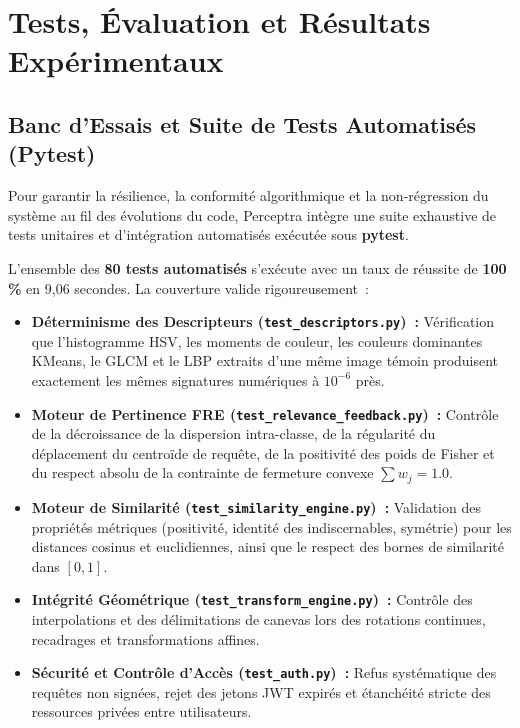 \chapter{Tests, Évaluation et Résultats Expérimentaux}
\label{chap:evaluation}

\section{Banc d'Essais et Suite de Tests Automatisés (Pytest)}

Pour garantir la résilience, la conformité algorithmique et la non-régression du système au fil des évolutions du code, Perceptra intègre une suite exhaustive de tests unitaires et d'intégration automatisés exécutée sous \textbf{pytest}.

L'ensemble des \textbf{80 tests automatisés} s'exécute avec un taux de réussite de \textbf{100\,\%} en 9,06 secondes. La couverture valide rigoureusement~:
\begin{itemize}
    \item \textbf{Déterminisme des Descripteurs (\texttt{test\_descriptors.py})~:} Vérification que l'histogramme HSV, les moments de couleur, les couleurs dominantes KMeans, le GLCM et le LBP extraits d'une même image témoin produisent exactement les mêmes signatures numériques à $10^{-6}$ près.
    \item \textbf{Moteur de Pertinence FRE (\texttt{test\_relevance\_feedback.py})~:} Contrôle de la décroissance de la dispersion intra-classe, de la régularité du déplacement du centroïde de requête, de la positivité des poids de Fisher et du respect absolu de la contrainte de fermeture convexe $\sum w_j = 1.0$.
    \item \textbf{Moteur de Similarité (\texttt{test\_similarity\_engine.py})~:} Validation des propriétés métriques (positivité, identité des indiscernables, symétrie) pour les distances cosinus et euclidiennes, ainsi que le respect des bornes de similarité dans $[0, 1]$.
    \item \textbf{Intégrité Géométrique (\texttt{test\_transform\_engine.py})~:} Contrôle des interpolations et des délimitations de canevas lors des rotations continues, recadrages et transformations affines.
    \item \textbf{Sécurité et Contrôle d'Accès (\texttt{test\_auth.py})~:} Refus systématique des requêtes non signées, rejet des jetons JWT expirés et étanchéité stricte des ressources privées entre utilisateurs.
\end{itemize}

